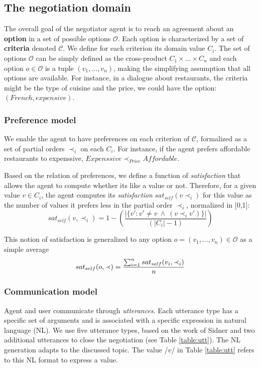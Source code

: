 \documentclass[runningheads,a4paper]{llncs}
\begin{document}
\subsection{The negotiation domain}

	The overall goal of the negotiator agent is to reach an agreement about an \textbf{option} in a set of possible options $\mathcal{O}$. 
	Each option is characterized by a set of \textbf{criteria} denoted $\mathcal{C}$. We define for each criterion its domain value $C_i$.
	The set of options $\mathcal{O}$ can be simply defined as the cross-product $C_1\times\ldots\times C_n$ and each option $o\in\mathcal{O}$ is a tuple $(v_1,\ldots,v_n)$, making the simplifying assumption that all options are available. For instance, in a dialogue about restaurants, the criteria might be the type of cuisine and the price, we could have the option: $(French,expensive)$.
	
	\subsubsection{Preference model} 
		We enable the agent to have preferences on each criterion of $\mathcal{C}$, formalized as a set of partial orders $\prec_i$ on each $C_i$. For instance, if the agent prefers affordable restaurants to expenssive, $Expenssive\prec_{Price}Affordable$.
		
		Based on the relation of preferences, we define a function of \emph{satisfaction} that allows the agent to compute whether its like a value or not. Therefore, for a given value $v\in C_i$, the agent computes its \emph{satisfaction} $sat_{self}(v \prec_i)$ for this value as the number of values it prefers less in the partial order $\prec_i$, normalized in [0,1]:
		\vspace{-.5em} 
		\begin{equation}
		sat_{self}(v, \prec_i) =	1 - \left( \frac{|\{v' : v' \neq v \  \wedge \ (v \prec_i v')\}| }{( |C_i| - 1 )}\right)
		\end{equation}
		
	This notion of satisfaction is generalized to any option $o= (v_1, \ldots, v_n)\in \mathcal{O}$ as a simple average
	\vspace{-1em} 
	\begin{equation}
	sat_{self}(o, \prec) = \frac{\sum_{i=1}^{n} sat_{self}(v_i, \prec_i) }{n}
	\vspace{-1.5em} 
	\end{equation}
	

	\subsubsection{Communication model}
	Agent and user communicate through \emph{utterances}. Each utterance type has a specific set of arguments and is associated with a specific expression in natural language (NL). We use five utterance types, based on the work of Sidner \cite{sidner1994artificial} and two additional utterances to close the negotiation (see Table \ref{table:utt}). The NL generation adapts to the discussed topic. The value /$v$/ in Table \ref{table:utt} refers to this NL format to express a value.
	
\end{document}
